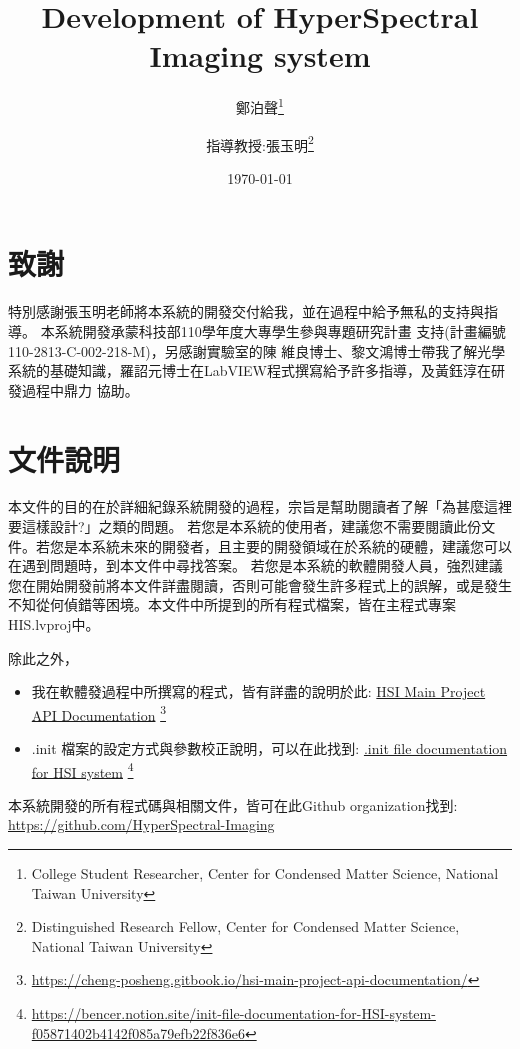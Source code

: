 \documentclass[12pt]{article}
\title{Development of HyperSpectral Imaging system}
\author{鄭泊聲\thanks{College Student Researcher, Center for Condensed Matter Science, National Taiwan University}
\and 指導教授:張玉明\thanks{Distinguished Research Fellow, Center for Condensed Matter Science, National Taiwan University}}
\date{\today}
\begin{document}
    \maketitle
    \section*{致謝}
    特別感謝張玉明老師將本系統的開發交付給我，並在過程中給予無私的支持與指導。
    本系統開發承蒙科技部110學年度大專學生參與專題研究計畫
支持(計畫編號110-2813-C-002-218-M)，另感謝實驗室的陳
維良博士、黎文鴻博士帶我了解光學系統的基礎知識，羅詔元博士在LabVIEW程式撰寫給予許多指導，及黃鈺淳在研發過程中鼎力
協助。
    \section*{文件說明}
    本文件的目的在於詳細紀錄系統開發的過程，宗旨是幫助閱讀者了解「為甚麼這裡要這樣設計?」之類的問題。
    若您是本系統的使用者，建議您不需要閱讀此份文件。若您是本系統未來的開發者，且主要的開發領域在於系統的硬體，建議您可以在遇到問題時，到本文件中尋找答案。
    若您是本系統的軟體開發人員，強烈建議您在開始開發前將本文件詳盡閱讀，否則可能會發生許多程式上的誤解，或是發生不知從何偵錯等困境。本文件中所提到的所有程式檔案，皆在主程式專案HIS.lvproj中。

    除此之外，
    \begin{itemize}
        \item 我在軟體發過程中所撰寫的程式，皆有詳盡的說明於此: \href{https://cheng-posheng.gitbook.io/hsi-main-project-api-documentation/}{HSI Main Project API Documentation} \footnote{\url{https://cheng-posheng.gitbook.io/hsi-main-project-api-documentation/}}
        \item .init 檔案的設定方式與參數校正說明，可以在此找到: \href{https://bencer.notion.site/init-file-documentation-for-HSI-system-f05871402b4142f085a79efb22f836e6}{.init file documentation for HSI system} \footnote{\url{https://bencer.notion.site/init-file-documentation-for-HSI-system-f05871402b4142f085a79efb22f836e6}}
    \end{itemize}
    本系統開發的所有程式碼與相關文件，皆可在此Github organization找到: \url{https://github.com/HyperSpectral-Imaging}
    \tableofcontents
\end{document}
